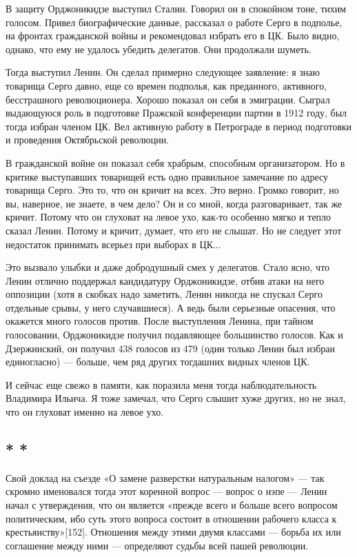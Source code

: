 \documentclass[12pt, a4paper, openany]{book}
\begin{document}
В защиту Орджоникидзе выступил Сталин. Говорил он в спокойном тоне, тихим голосом. Привел биографические данные, рассказал о работе Серго в подполье, на фронтах гражданской войны и рекомендовал избрать его в ЦК. Было видно, однако, что ему не удалось убедить делегатов. Они продолжали шуметь.

Тогда выступил Ленин. Он сделал примерно следующее заявление: я знаю товарища Серго давно, еще со времен подполья, как преданного, активного, бесстрашного революционера. Хорошо показал он себя в эмиграции. Сыграл выдающуюся роль в подготовке Пражской конференции партии в 1912 году, был тогда избран членом ЦК. Вел активную работу в Петрограде в период подготовки и проведения Октябрьской революции.

В гражданской войне он показал себя храбрым, способным организатором. Но в критике выступавших товарищей есть одно правильное замечание по адресу товарища Серго. Это то, что он кричит на всех. Это верно. Громко говорит, но вы, наверное, не знаете, в чем дело? Он и со мной, когда разговаривает, так же кричит. Потому что он глуховат на левое ухо, как-то особенно мягко и тепло сказал Ленин. Потому и кричит, думает, что его не слышат. Но не следует этот недостаток принимать всерьез при выборах в ЦК...

Это вызвало улыбки и даже добродушный смех у делегатов. Стало ясно, что Ленин отлично поддержал кандидатуру Орджоникидзе, отбив атаки на него оппозиции (хотя в скобках надо заметить, Ленин никогда не спускал Серго отдельные срывы, у него случавшиеся). А ведь были серьезные опасения, что окажется много голосов против. После выступления Ленина, при тайном голосовании, Орджоникидзе получил подавляющее большинство голосов. Как и Дзержинский, он получил 438 голосов из 479 (один только Ленин был избран единогласно) — больше, чем ряд других тогдашних видных членов ЦК.

И сейчас еще свежо в памяти, как поразила меня тогда наблюдательность Владимира Ильича. Я тоже замечал, что Серго слышит хуже других, но не знал, что он глуховат именно на левое ухо.

\subsection*{\center * * *}

Свой доклад на съезде «О замене разверстки натуральным налогом» — так скромно именовался тогда этот коренной вопрос — вопрос о нэпе — Ленин начал с утверждения, что он является «прежде всего и больше всего вопросом политическим, ибо суть этого вопроса состоит в отношении рабочего класса к крестьянству»[152]. Отношения между этими двумя классами — борьба их или соглашение между ними — определяют судьбы всей пашей революции.
\end{document}
